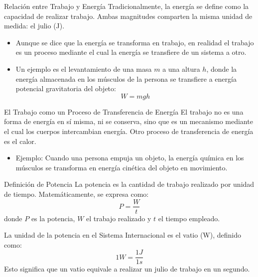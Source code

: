\documentclass[main.tex]{subfiles}
\begin{document}
\begin{frame}{Relación entre Trabajo y Energía}
  \justifying
  Tradicionalmente, la energía se define como la capacidad de realizar trabajo. Ambas magnitudes comparten la misma unidad de medida: el julio (J).
  \begin{itemize}
    \item Aunque se dice que la energía se transforma en trabajo, en realidad el trabajo es un proceso mediante el cual la energía se transfiere de un sistema a otro.
    \item Un ejemplo es el levantamiento de una masa $m$ a una altura $h$, donde la energía almacenada en los músculos de la persona se transfiere a energía potencial gravitatoria del objeto:
    \begin{equation}
      W = mgh
    \end{equation}
  \end{itemize}
\end{frame}

\begin{frame}{El Trabajo como un Proceso de Transferencia de Energía}
  \justifying
  El trabajo no es una forma de energía en sí misma, ni se conserva, sino que es un mecanismo mediante el cual los cuerpos intercambian energía. Otro proceso de transferencia de energía es el calor.
  \begin{itemize}
    \item Ejemplo: Cuando una persona empuja un objeto, la energía química en los músculos se transforma en energía cinética del objeto en movimiento.
  \end{itemize}
\end{frame}




\begin{frame}{Definición de Potencia}
  \justifying
  La potencia es la cantidad de trabajo realizado por unidad de tiempo. Matemáticamente, se expresa como:
  \begin{equation}
    P = \frac{W}{t}
  \end{equation}
  donde $P$ es la potencia, $W$ el trabajo realizado y $t$ el tiempo empleado.

  La unidad de la potencia en el Sistema Internacional es el vatio (W), definido como:
  \begin{equation}
    1 W = \frac{1 J}{1 s}
  \end{equation}
  Esto significa que un vatio equivale a realizar un julio de trabajo en un segundo.
\end{frame}
\end{document}
